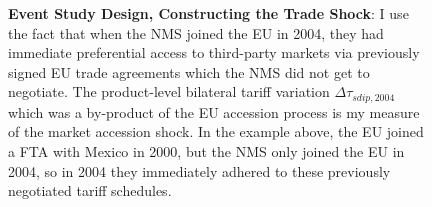 \documentclass{article}
\begin{document}
\begin{figure}[h]
    \centering
    \caption{\textbf{Event Study Design, Constructing the Trade Shock}: I use the fact that when the NMS joined the EU in 2004, they had immediate preferential access to third-party markets via previously signed EU trade agreements which the NMS did not get to negotiate. The product-level bilateral tariff variation $\Delta \tau_{sdip,2004}$ which was a by-product of the EU accession process is my measure of the market accession shock. In the example above, the EU joined a FTA with Mexico in 2000, but the NMS only joined the EU in 2004, so in 2004 they immediately adhered to these previously negotiated tariff schedules.}
    \label{fig:event_study_design}
\end{figure}
\end{document}
